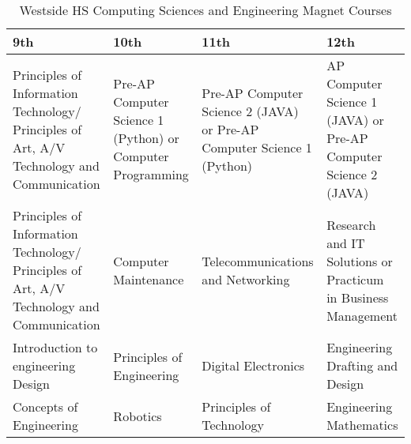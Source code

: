 \begin{table}[]
	\centering
	\footnotesize
	\caption{Westside HS Computing Sciences and Engineering Magnet Courses \cite{westside}}
	\label{westsidemag}
	\begin{tabular}{|p{3.5cm}|p{3.5cm}|p{3.5cm}|p{3.5cm}|}
		\hline
	\textbf{9th}     & \textbf{10th}        & \textbf{11th}         & \textbf{12th}               \\ \hline
Principles of Information Technology/ Principles of Art, A/V Technology and Communication & Pre-AP Computer Science 1 (Python) or Computer Programming & Pre-AP Computer Science 2 (JAVA) or Pre-AP Computer Science 1 (Python) & AP Computer Science 1 (JAVA) or Pre-AP Computer Science 2 (JAVA) \\ \hline
Principles of Information Technology/ Principles of Art, A/V Technology and Communication & Computer Maintenance & Telecommunications and Networking & Research and IT Solutions or Practicum in Business Management    \\\hline
Introduction to engineering Design & Principles of Engineering & Digital Electronics & Engineering Drafting and Design \\\hline
Concepts of Engineering & Robotics & Principles of Technology & Engineering Mathematics \\ \hline                                    \end{tabular}
\end{table}

